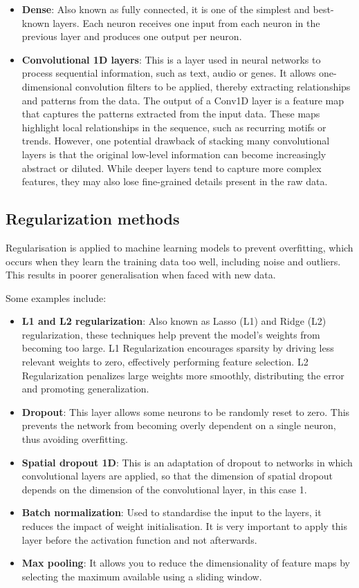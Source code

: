 \begin{itemize}
    \item \textbf{Dense}: Also known as fully connected, it is one of the simplest and best-known layers. Each neuron receives one input from each neuron in the previous layer and produces one output per neuron.
    \item \textbf{Convolutional 1D layers}: This is a layer used in neural networks to process sequential information, such as text, audio or genes. It allows one-dimensional convolution filters to be applied, thereby extracting relationships and patterns from the data. The output of a Conv1D layer is a feature map that captures the patterns extracted from the input data. These maps highlight local relationships in the sequence, such as recurring motifs or trends. However, one potential drawback of stacking many convolutional layers is that the original low-level information can become increasingly abstract or diluted. While deeper layers tend to capture more complex features, they may also lose fine-grained details present in the raw data.
\end{itemize}

\subsection{Regularization methods}

Regularisation is applied to machine learning models to prevent overfitting, which occurs when they learn the training data too well, including noise and outliers. This results in poorer generalisation when faced with new data.

Some examples include:
\begin{itemize}
    \item \textbf{L1 and L2 regularization}: Also known as Lasso (L1) and Ridge (L2) regularization, these techniques help prevent the model's weights from becoming too large. L1 Regularization encourages sparsity by driving less relevant weights to zero, effectively performing feature selection. L2 Regularization penalizes large weights more smoothly, distributing the error and promoting generalization.
    \item \textbf{Dropout}: This layer allows some neurons to be randomly reset to zero. This prevents the network from becoming overly dependent on a single neuron, thus avoiding overfitting.
    \item \textbf{Spatial dropout 1D}: This is an adaptation of dropout to networks in which convolutional layers are applied, so that the dimension of spatial dropout depends on the dimension of the convolutional layer, in this case 1.
    \item \textbf{Batch normalization}: Used to standardise the input to the layers, it reduces the impact of weight initialisation. It is very important to apply this layer before the activation function and not afterwards.
    \item \textbf{Max pooling}: It allows you to reduce the dimensionality of feature maps by selecting the maximum available using a sliding window.
\end{itemize}



